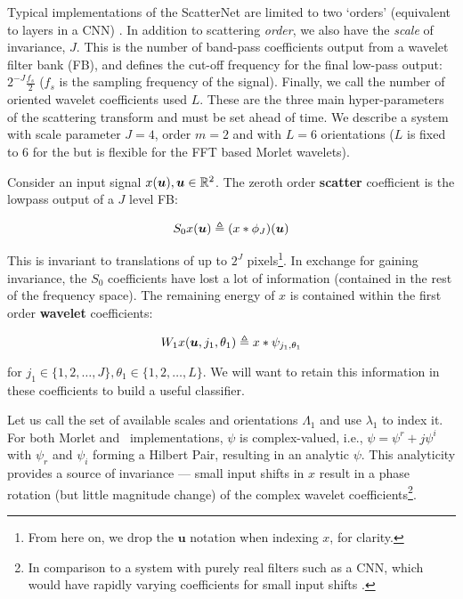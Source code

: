 Typical implementations of the ScatterNet are limited to two `orders'
(equivalent to layers in a CNN) \cite{oyallon_deep_2015, singh_dual-tree_2017,
oyallon_scaling_2017}. In addition to scattering \emph{order}, we also have the
\emph{scale} of invariance, $J$. This is the number of band-pass coefficients
output from a wavelet filter bank (FB), and defines the cut-off frequency for
the final low-pass output: $2^{-J}\frac{f_s}{2}$ ($f_s$ is the sampling
frequency of the signal). Finally, we call the number of oriented wavelet
coefficients used $L$.  These are the three main hyper-parameters of the
scattering transform and must be set ahead of time. We describe a system with
scale parameter $J=4$, order $m=2$ and with $L=6$ orientations ($L$ is fixed
to 6 for the \DTCWT but is flexible for the FFT based Morlet wavelets).

Consider an input signal $x(\bm{u}), \bm{u}\in\reals[2]$. The zeroth order
\textbf{scatter} coefficient is the lowpass output of a $J$ level FB: 

\begin{equation}
  S_0x(\bm{u}) \definedas (x \conv \phi_J)(\bm{u})
\end{equation}

This is invariant to translations of up to $2^J$ pixels\footnote{From here on,
we drop the $\bm{u}$ notation when indexing $x$, for clarity.}. In exchange for
gaining invariance, the $S_0$ coefficients have lost a lot of information
(contained in the rest of the frequency space). The remaining energy of $x$ is
contained within the first order \textbf{wavelet} coefficients:

\begin{equation}
W_1x(\bm{u}, j_1, \theta_1) \definedas x \conv \psi_{j_1, \theta_1}
\end{equation}

for $j_1\in\{1,2, \ldots, J\}, \theta_1\in\{1,2, \ldots, L\}$. We will want to
retain this information in these coefficients to build a useful classifier.

Let us call the set
of available scales and orientations $\Lambda_1$ and use $\lambda_1$ to index it.
For both Morlet and \DTCWT\ implementations, $\psi$ is complex-valued, i.e.,
$\psi = \psi^r + j\psi^i$ with $\psi_r$ and $\psi_i$ forming a Hilbert Pair,
resulting in an analytic $\psi$.
 This analyticity provides a source of
invariance --- small input shifts in $x$ result in a phase rotation (but little
magnitude change) of the complex wavelet coefficients\footnote{In comparison to
a system with purely real filters such as a CNN, which would have rapidly
varying coefficients for small input shifts \cite{kingsbury_complex_2001}.}.

